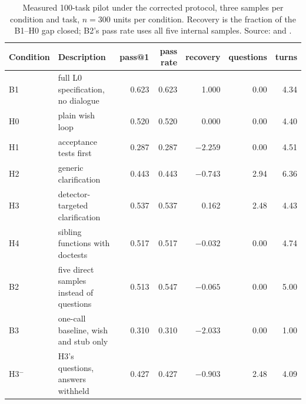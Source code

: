 \documentclass{article}
\begin{document}
\begin{table}[!ht]
  \centering
  \small
  \setlength{\tabcolsep}{4pt}
  \begin{tabular}{@{}llrrrrr@{}}
    \toprule
    Condition & Description & pass@1 & pass rate & recovery & questions & turns \\
    \midrule
    B1 & full L0 specification, no dialogue & 0.623 & 0.623 & 1.000 & 0.00 & 4.34 \\
    H0 & plain wish loop & 0.520 & 0.520 & 0.000 & 0.00 & 4.40 \\
    H1 & acceptance tests first & 0.287 & 0.287 & $-2.259$ & 0.00 & 4.51 \\
    H2 & generic clarification & 0.443 & 0.443 & $-0.743$ & 2.94 & 6.36 \\
    H3 & detector-targeted clarification & 0.537 & 0.537 & 0.162 & 2.48 & 4.43 \\
    H4 & sibling functions with doctests & 0.517 & 0.517 & $-0.032$ & 0.00 & 4.74 \\
    B2 & five direct samples instead of questions & 0.513 & 0.547 & $-0.065$ & 0.00 & 5.00 \\
    B3 & one-call baseline, wish and stub only & 0.310 & 0.310 & $-2.033$ & 0.00 & 1.00 \\
    H3$^-$ & H3's questions, answers withheld & 0.427 & 0.427 & $-0.903$ & 2.48 & 4.09 \\
    \bottomrule
  \end{tabular}
  \caption{Measured 100-task pilot under the corrected protocol, three samples per condition
  and task, $n=300$ units per condition. Recovery is the fraction of the B1--H0 gap closed;
  B2's pass rate uses all five internal samples. Source:
  \protect{} and
  \protect{}.}
  \label{tab:conditions}
\end{table}
\end{document}
